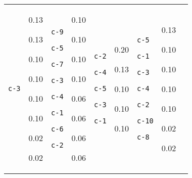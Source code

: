{\begin{tabular}{@{}p{1.2cm}|p{1.3cm}@{}p{0.8cm}@{}|p{1.3cm}@{}p{0.8cm}@{}|p{1.3cm}@{}p{0.8cm}@{}|p{1.3cm}@{}p{0.8cm}@{}}
\texttt{c-3} & 0.13

0.13

0.10

0.10

0.10

0.10

0.02

0.02 & \texttt{c-9}

\texttt{c-5}

\texttt{c-7}

\texttt{c-3}

\texttt{c-4}

\texttt{c-1}

\texttt{c-6}

\texttt{c-2} & 0.10

0.10

0.10

0.10

0.06

0.06

0.06

0.06 & \texttt{c-2}

\texttt{c-4}

\texttt{c-5}

\texttt{c-3}

\texttt{c-1} & 0.20

0.13

0.10

0.10

0.10 & \texttt{c-5}

\texttt{c-1}

\texttt{c-3}

\texttt{c-4}

\texttt{c-2}

\texttt{c-10}

\texttt{c-8} & 0.13

0.10

0.10

0.10

0.10

0.02

0.02
\end{tabular}}

